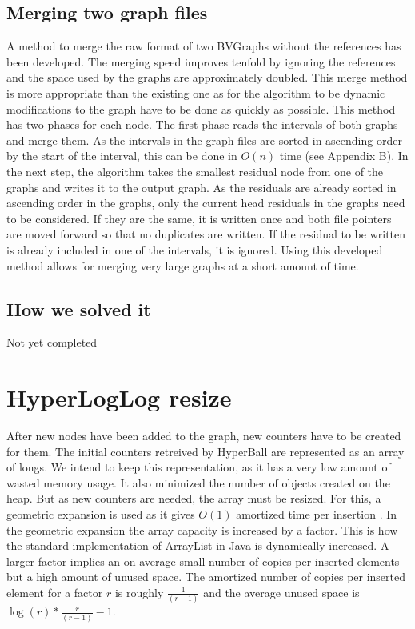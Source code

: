 \subsection{Merging two graph files}
A method to merge the raw format of two BVGraphs without the references has been developed. The merging speed improves  tenfold by ignoring the references and the space used by the graphs are approximately doubled. This merge method is more appropriate than the existing one as for the algorithm to be dynamic modifications to the graph have to be done as quickly as possible. This method has two phases for each node. The first phase reads the intervals of both graphs and merge them. As the intervals in the graph files are sorted in ascending order by the start of the interval, this can be done in $O(n)$ time (see Appendix B). In the next step, the algorithm takes the smallest residual node from one of the graphs and writes it to the output graph. As the residuals are already sorted in ascending order in the graphs, only the current head residuals in the graphs need to be considered. If they are the same, it is written once and both file pointers are moved forward so that no duplicates are written. If the residual to be written is already included in one of the intervals, it is ignored. Using this developed method allows for merging very large graphs at a short amount of time.

\subsection{How we solved it}
Not yet completed

\section{HyperLogLog resize}
After new nodes have been added to the graph, new counters have to be created for them. The initial counters retreived by HyperBall are represented as an array of longs. We intend to keep this representation, as it has a very low amount of wasted memory usage. It also minimized the number of objects created on the heap. But as new counters are needed, the array must be resized. For this, a geometric expansion is used as it gives $O(1)$ amortized time per insertion \cite{dynamicarrays}. In the geometric expansion the array capacity is increased by a factor. This is how the standard implementation of ArrayList in Java is dynamically increased. A larger factor implies an on average small number of copies per inserted elements but a high amount of unused space. The amortized number of copies per inserted element for a factor $r$ is roughly $\frac{1}{(r-1)}$ and the average unused space is $\log(r)*\frac{r}{(r-1)} - 1$. \cite{dynamicarrays}

